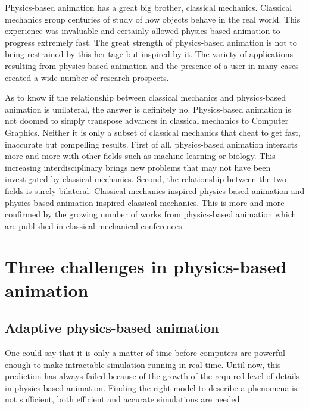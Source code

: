 Physics-based animation has a great big brother, classical mechanics. Classical mechanics group centuries of study of how objects behave in the real world. This experience was invaluable and certainly allowed physics-based animation to progress extremely fast. The great strength of physics-based animation is not to being restrained by this heritage but inspired by it. The variety of applications resulting from physics-based animation and the presence of a user in many cases  created a wide number of research prospects.

As to know if the relationship between classical mechanics and physics-based animation is unilateral, the answer is definitely no. Physics-based animation is not doomed to simply transpose advances in classical mechanics to Computer Graphics. Neither it is only a subset of classical mechanics that cheat to get fast, inaccurate but compelling results. First of all, physics-based animation interacts more and more with other fields such as machine learning or biology. This increasing interdisciplinary brings new problems that may not have been investigated by classical mechanics. Second, the relationship between the two fields is surely bilateral. Classical mechanics inspired physics-based animation and physics-based animation inspired classical mechanics. This is more and more confirmed by the growing number of works from physics-based animation which are published in classical mechanical conferences.

\section{Three challenges in physics-based animation}

\subsection{Adaptive physics-based animation}
One could say that it is only a matter of time before computers are powerful enough to make intractable simulation running in real-time. Until now, this prediction has always failed because of the growth of the required level of details in physics-based animation. Finding the right model to describe a phenomena is not sufficient, both efficient and accurate simulations are needed.

